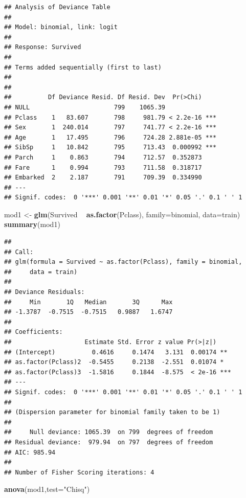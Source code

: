 \documentclass[]{book}
\newenvironment{Shaded}{\begin{snugshade}}{\end{snugshade}}
\newcommand{\KeywordTok}[1]{\textcolor[rgb]{0.13,0.29,0.53}{\textbf{#1}}}
\newcommand{\DataTypeTok}[1]{\textcolor[rgb]{0.13,0.29,0.53}{#1}}
\newcommand{\StringTok}[1]{\textcolor[rgb]{0.31,0.60,0.02}{#1}}
\newcommand{\OperatorTok}[1]{\textcolor[rgb]{0.81,0.36,0.00}{\textbf{#1}}}
\newcommand{\NormalTok}[1]{#1}
\begin{document}
\begin{verbatim}
## Analysis of Deviance Table
## 
## Model: binomial, link: logit
## 
## Response: Survived
## 
## Terms added sequentially (first to last)
## 
## 
##          Df Deviance Resid. Df Resid. Dev  Pr(>Chi)    
## NULL                       799    1065.39              
## Pclass    1   83.607       798     981.79 < 2.2e-16 ***
## Sex       1  240.014       797     741.77 < 2.2e-16 ***
## Age       1   17.495       796     724.28 2.881e-05 ***
## SibSp     1   10.842       795     713.43  0.000992 ***
## Parch     1    0.863       794     712.57  0.352873    
## Fare      1    0.994       793     711.58  0.318717    
## Embarked  2    2.187       791     709.39  0.334990    
## ---
## Signif. codes:  0 '***' 0.001 '**' 0.01 '*' 0.05 '.' 0.1 ' ' 1
\end{verbatim}

\begin{Shaded}
\begin{Highlighting}[]
\NormalTok{mod1 <-}\StringTok{ }\KeywordTok{glm}\NormalTok{(Survived }\OperatorTok{~}\StringTok{ }\KeywordTok{as.factor}\NormalTok{(Pclass), }\DataTypeTok{family=}\NormalTok{binomial, }\DataTypeTok{data=}\NormalTok{train)}
\KeywordTok{summary}\NormalTok{(mod1)}
\end{Highlighting}
\end{Shaded}

\begin{verbatim}
## 
## Call:
## glm(formula = Survived ~ as.factor(Pclass), family = binomial, 
##     data = train)
## 
## Deviance Residuals: 
##     Min       1Q   Median       3Q      Max  
## -1.3787  -0.7515  -0.7515   0.9887   1.6747  
## 
## Coefficients:
##                    Estimate Std. Error z value Pr(>|z|)    
## (Intercept)          0.4616     0.1474   3.131  0.00174 ** 
## as.factor(Pclass)2  -0.5455     0.2138  -2.551  0.01074 *  
## as.factor(Pclass)3  -1.5816     0.1844  -8.575  < 2e-16 ***
## ---
## Signif. codes:  0 '***' 0.001 '**' 0.01 '*' 0.05 '.' 0.1 ' ' 1
## 
## (Dispersion parameter for binomial family taken to be 1)
## 
##     Null deviance: 1065.39  on 799  degrees of freedom
## Residual deviance:  979.94  on 797  degrees of freedom
## AIC: 985.94
## 
## Number of Fisher Scoring iterations: 4
\end{verbatim}

\begin{Shaded}
\begin{Highlighting}[]
\KeywordTok{anova}\NormalTok{(mod1,}\DataTypeTok{test=}\StringTok{"Chisq"}\NormalTok{)}
\end{Highlighting}
\end{Shaded}
\end{document}
